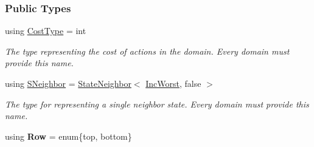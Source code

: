 \subsubsection*{Public Types}
\begin{DoxyCompactItemize}
\item 
using \hyperlink{structdomain_1_1incWorst_1_1IncWorst_a75b1bb232780f05dcf76efbe8a83ad7b}{Cost\+Type} = int\hypertarget{structdomain_1_1incWorst_1_1IncWorst_a75b1bb232780f05dcf76efbe8a83ad7b}{}\label{structdomain_1_1incWorst_1_1IncWorst_a75b1bb232780f05dcf76efbe8a83ad7b}

\begin{DoxyCompactList}\small\item\em The type representing the cost of actions in the domain. Every domain must provide this name. \end{DoxyCompactList}\item 
using \hyperlink{structdomain_1_1incWorst_1_1IncWorst_ad8493d75afb1ff651ab6c20cb20541fa}{S\+Neighbor} = \hyperlink{structStateNeighbor}{State\+Neighbor}$<$ \hyperlink{structdomain_1_1incWorst_1_1IncWorst}{Inc\+Worst}, false $>$\hypertarget{structdomain_1_1incWorst_1_1IncWorst_ad8493d75afb1ff651ab6c20cb20541fa}{}\label{structdomain_1_1incWorst_1_1IncWorst_ad8493d75afb1ff651ab6c20cb20541fa}

\begin{DoxyCompactList}\small\item\em The type for representing a single neighbor state. Every domain must provide this name. \end{DoxyCompactList}\item 
using {\bfseries Row} = enum\{top, bottom\}\hypertarget{structdomain_1_1incWorst_1_1IncWorst_a09be641cb9c74d45813418a82d67088a}{}\label{structdomain_1_1incWorst_1_1IncWorst_a09be641cb9c74d45813418a82d67088a}

\end{DoxyCompactItemize}
